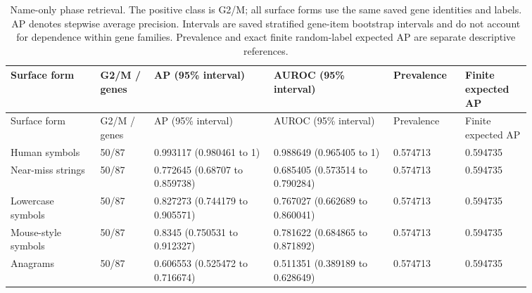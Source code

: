 \begin{longtable}{@{}L{0.15\linewidth}L{0.09\linewidth}L{0.2\linewidth}L{0.2\linewidth}L{0.11\linewidth}L{0.11\linewidth}@{}}
\caption{Name-only phase retrieval. The positive class is G2/M; all surface forms use the same saved gene identities and labels. AP denotes stepwise average precision. Intervals are saved stratified gene-item bootstrap intervals and do not account for dependence within gene families. Prevalence and exact finite random-label expected AP are separate descriptive references.}\\
\toprule
Surface form & G2/M / genes & AP (95\% interval) & AUROC (95\% interval) & Prevalence & Finite expected AP \\
\midrule
\endfirsthead
\toprule
Surface form & G2/M / genes & AP (95\% interval) & AUROC (95\% interval) & Prevalence & Finite expected AP \\
\midrule
\endhead
\endfoot
\bottomrule
\endlastfoot
Human symbols & 50/87 & 0.993117 (0.980461 to 1) & 0.988649 (0.965405 to 1) & 0.574713 & 0.594735 \\
Near-miss strings & 50/87 & 0.772645 (0.68707 to 0.859738) & 0.685405 (0.573514 to 0.790284) & 0.574713 & 0.594735 \\
Lowercase symbols & 50/87 & 0.827273 (0.744179 to 0.905571) & 0.767027 (0.662689 to 0.860041) & 0.574713 & 0.594735 \\
Mouse-style symbols & 50/87 & 0.8345 (0.750531 to 0.912327) & 0.781622 (0.684865 to 0.871892) & 0.574713 & 0.594735 \\
Anagrams & 50/87 & 0.606553 (0.525472 to 0.716674) & 0.511351 (0.389189 to 0.628649) & 0.574713 & 0.594735 \\
\end{longtable}
